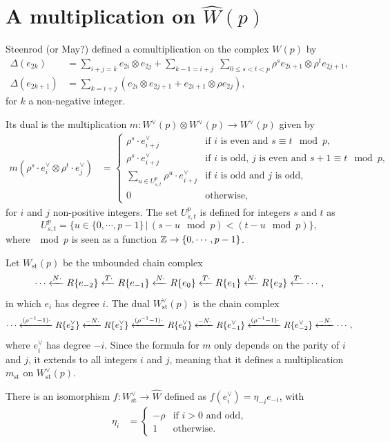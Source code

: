 \section{A multiplication on $\widehat W(p)$}\label{multiplications}
 Steenrod (or May?) defined a comultiplication on the complex $W(p)$ by
\begin{align*}
\Delta(e_{2k})&= \sum_{i+j=k} e_{2i}\otimes e_{2j} + \sum_{k-1=i+j} \; \sum_{0\leq s<t<p} \rho^s e_{2i+1}\otimes \rho^t e_{2j+1}, \\
\Delta(e_{2k+1})&=  \sum_{k=i+j} \left (e_{2i}\otimes e_{2j+1} + e_{2i+1}\otimes \rho e_{2j}\right ),
\end{align*}
for $k$ a non-negative integer.

Its dual is the multiplication $m\colon W^\vee(p)\otimes W^\vee(p)\to W^\vee(p)$ given by
\begin{align*}
	m(\rho^s \cdot e^\vee_i\otimes \rho^t \cdot e^\vee_j)&= \begin{cases}
	\rho^s \cdot e^\vee_{i+j}& \text{if $i$ is even and $s\equiv t \mod p$,}
	\\
	\rho^s \cdot e^\vee_{i+j}& \text{if $i$ is odd, $j$ is even and $s+1\equiv t \mod p$,}
	\\
	\sum_{u\in U^p_{s,t}}\rho^u\cdot e^\vee_{i+j} & \text{if $i$ is odd and $j$ is odd,}
	\\
	0&\text{otherwise,}
	\end{cases}
\end{align*}
for $i$ and $j$ non-positive integers. The set $U^p_{s,t}$ is defined for integers $s$ and $t$ as
\[
U^p_{s,t}=\{u\in\{0,\cdots,p-1\}\, |\,  (s-u \mod p) < (t-u \mod p)\},
\]
where $\mod p$ is seen as a function $\mathbb{Z}\to \{0,\cdots,p-1\}$.

Let $W_{\text{st}}(p)$ be the unbounded chain complex
\[
 \cdots \xleftarrow{N\cdot} R\{e_{-2}\} \xleftarrow{T\cdot} R\{e_{-1}\} \xleftarrow{N\cdot} R\{e_0\} \xleftarrow{T\cdot} R\{e_1\} \xleftarrow{N\cdot} R\{e_2\} \xleftarrow{T\cdot} \cdots,
\]
in which $e_i$ has degree $i$. The dual $W_{\text{st}}^\vee(p)$ is the chain complex
\[
 \cdots \xleftarrow{(\rho^{-1}-1)\cdot} R\{e_{2}^\vee\} \xleftarrow{-N\cdot} R\{e_{1}^\vee\} \xleftarrow{(\rho^{-1}-1)\cdot} R\{e_0^\vee\} \xleftarrow{-N\cdot} R\{e_{-1}^\vee\} \xleftarrow{(\rho^{-1}-1)\cdot} R\{e_{-2}^\vee\} \xleftarrow{-N\cdot} \cdots,
\]
where $e_i^\vee$ has degree $-i$. Since the formula for $m$ only depends on the parity of $i$ and $j$, it extends to all integers $i$ and $j$, meaning that it defines a multiplication $m_{\text{st}}$ on $W^\vee_{\text{st}}(p)$.

There is an isomorphism $f\colon W^\vee_{\text{st}}\to \widehat W$ defined as $f(e^\vee_i)=\eta_{-i}e_{-i}$, with
\begin{align*}
	\eta_i&= \begin{cases}
	-\rho & \text{if $i>0$ and odd,}
	\\
	1 &\text{otherwise.}
	\end{cases}
\end{align*}

